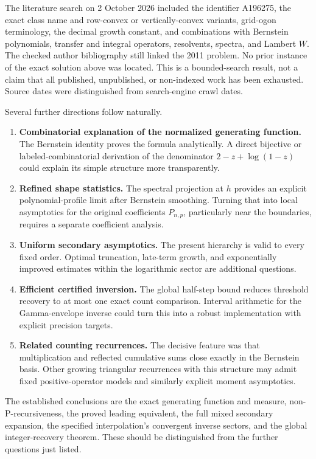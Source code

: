 \documentclass[11pt,letterpaper]{article}
\theoremstyle{remark}\newtheorem{remark}[theorem]{Remark}
\begin{document}
The literature search on 2 October 2026 included the identifier A196275, the exact class name and row-convex or vertically-convex variants, grid-ogon terminology, the decimal growth constant, and combinations with Bernstein polynomials, transfer and integral operators, resolvents, spectra, and Lambert $W$. The checked author bibliography still linked the 2011 problem. No prior instance of the exact solution above was located. This is a bounded-search result, not a claim that all published, unpublished, or non-indexed work has been exhausted. Source dates were distinguished from search-engine crawl dates.

Several further directions follow naturally.
\begin{enumerate}
\item \textbf{Combinatorial explanation of the normalized generating function.} The Bernstein identity proves the formula analytically. A direct bijective or labeled-combinatorial derivation of the denominator $2-z+\log(1-z)$ could explain its simple structure more transparently.
\item \textbf{Refined shape statistics.} The spectral projection at $h$ provides an explicit polynomial-profile limit after Bernstein smoothing. Turning that into local asymptotics for the original coefficients $P_{n,p}$, particularly near the boundaries, requires a separate coefficient analysis.
\item \textbf{Uniform secondary asymptotics.} The present hierarchy is valid to every fixed order. Optimal truncation, late-term growth, and exponentially improved estimates within the logarithmic sector are additional questions.
\item \textbf{Efficient certified inversion.} The global half-step bound reduces threshold recovery to at most one exact count comparison. Interval arithmetic for the Gamma-envelope inverse could turn this into a robust implementation with explicit precision targets.
\item \textbf{Related counting recurrences.} The decisive feature was that multiplication and reflected cumulative sums close exactly in the Bernstein basis. Other growing triangular recurrences with this structure may admit fixed positive-operator models and similarly explicit moment asymptotics.
\end{enumerate}
The established conclusions are the exact generating function and measure, non-P-recursiveness, the proved leading equivalent, the full mixed secondary expansion, the specified interpolation's convergent inverse sectors, and the global integer-recovery theorem. These should be distinguished from the further questions just listed.
\end{document}
